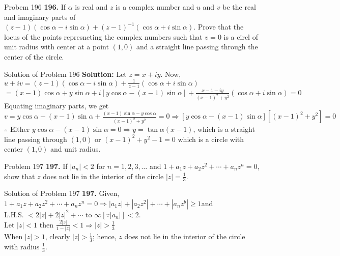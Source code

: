 \documentclass[aspectratio=169,8pt]{beamer}
\begin{document}
\begin{frame}{Probem 196}
  \textbf{196.} If $\alpha$ is real and $z$ is a complex number and $u$ and $v$ be the real and imaginary parts of $(z -
  1)(\cos\alpha -i\sin\alpha) + (z - 1)^{-1}(\cos\alpha + i\sin\alpha)$. Prove that the locus of the points represneting the
  complex numbers such that $v = 0$ is a circl of unit radius with center at a point $(1, 0)$ and a straight line passing through
  the center of the circle.
\end{frame}
\begin{frame}{Solution of Problem 196}
  \textbf{Solution:} Let $z = x + iy$. Now, $u + iv = (z - 1)(\cos\alpha - i\sin\alpha) + \frac{1}{z - 1}(\cos\alpha + i\sin\alpha)$\\
  \vspace*{0.2cm}
  $= (x - 1)\cos\alpha + y\sin\alpha + i[y\cos\alpha - (x - 1)\sin\alpha] + \frac{x - 1 - iy}{(x - 1)^2 + y^2}(\cos\alpha +
  i\sin\alpha) = 0$\\
  \vspace*{0.2cm}
  Equating imaginary parts, we get\\
  \vspace*{0.2cm}
  $v = y\cos\alpha - (x - 1)\sin\alpha + \frac{(x - 1)\sin\alpha - y\cos\alpha}{(x - 1)^2 + y^2} = 0\Rightarrow [y\cos\alpha - (x -
    1)\sin\alpha][(x - 1)^2 + y^2] = 0$\\
  \vspace*{0.2cm}
  $\therefore $ Either $y\cos\alpha - (x - 1)\sin\alpha = 0 \Rightarrow y = \tan\alpha(x - 1)$, which is a straight line passing
  through $(1, 0)$ or $(x - 1)^2 + y^2 - 1 = 0$ which is a circle with center $(1, 0)$ and unit radius.
\end{frame}
\begin{frame}{Problem 197}
  \textbf{197.} If $|a_n| < 2$ for $n = 1, 2, 3, \ldots$ and $1 + a_1z + a_2z^2 + \cdots + a_nz^n = 0$, show that $z$ does not lie
  in the interior of the circle $|z| = \frac{1}{3}$.
\end{frame}
\begin{frame}{Solution of Problem 197}
  \textbf{197.} Given, $1 + a_1z + a_2z^2 + \cdots + a_nz^n = 0 \Rightarrow |a_1z| + |a_2z^2| + \cdots + |a_nz^b|\geq 1$and\\
  \vspace*{0.2cm}
  L.H.S. $ < 2|z| + 2|z|^2 + \cdots$ to $\infty[\because |a_n|] < 2$.\\
  \vspace*{0.2cm}
  Let $|z| < 1$ then $\frac{2|z|}{1 - |z|} < 1 \Rightarrow |z| > \frac{1}{3}$\\
  \vspace*{0.2cm}
  When $|z|> 1$, clearly $|z| > \frac{1}{3}$; hence, $z$ does not lie in the interior of the circle with radius $\frac{1}{3}$.
\end{frame}
\end{document}
